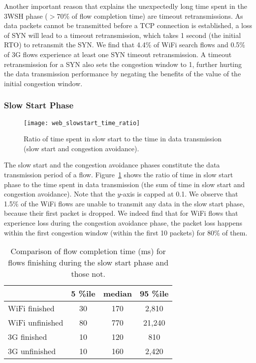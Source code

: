 Another important reason that explains the unexpectedly long time spent in the 3WSH phase (\ie $>70\%$ of flow completion time) are timeout retransmissions. As data packets cannot be transmitted before a TCP connection is established, a loss of SYN will lead to a timeout retransmission, which takes 1 second (\ie the initial RTO) to retransmit the SYN. We find that 4.4\% of WiFi search flows and 0.5\% of 3G flows experience at least one SYN timeout retransmission. A timeout retransmission for a SYN also sets the congestion window to 1, further hurting the data transmission performance by negating the benefits of the value of the initial congestion window. 

\subsubsection{Slow Start Phase}

\begin{figure}[th]
\centering
\texttt{[image: web\_slowstart\_time\_ratio]}
\caption{Ratio of time spent in slow start to the time in data transmission (slow start and congestion avoidance).}
\label{fig:web_ss_time_ratio}
\end{figure}

The slow start and the congestion avoidance phases constitute the data transmission period of a flow. Figure~\ref{fig:web_ss_time_ratio} shows the ratio of time in slow start phase to the time spent in data transmission (\ie the sum of time in slow start and congestion avoidance). Note that the $y$-axis is capped at 0.1. We observe that 1.5\% of the WiFi flows are unable to transmit any data in the slow start phase, because their first packet is dropped. We indeed find that for WiFi flows that experience loss during the congestion avoidance phase, the packet loss happens within the first congestion window (\ie within the first 10 packets) for 80\% of them.

\begin{table}[th]
\caption{Comparison of flow completion time (ms) for flows finishing during the slow start phase and those not.}
\label{tab:web_finish_time_3rd_phase}
\centering
\renewcommand{\arraystretch}{1.0}

\begin{tabular}{l|c|c|c}
\hline
& 5 \%ile & median & 95 \%ile \\
\hline
WiFi finished & 30 & 170 & 2,810 \\
WiFi unfinished & 80 & 770 & 21,240 \\

\hline
3G finished & 10 & 120 & 810 \\
3G unfinished & 10 & 160 & 2,420 \\

\hline
\end{tabular}
\end{table}

